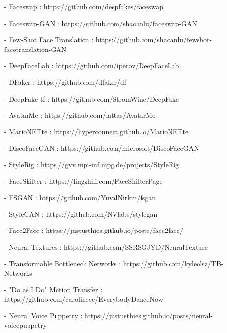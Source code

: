 \begin{itemize}

\item [-]Faceswap : https://github.com/deepfakes/faceswap

\item [-]Faceswap-GAN : https://github.com/shaoanlu/faceswap-GAN

\item [-]Few-Shot Face Translation : https://github.com/shaoanlu/fewshot-facetranslation-GAN

\item [-]DeepFaceLab : https://github.com/iperov/DeepFaceLab

\item [-]DFaker : https://github.com/dfaker/df

\item [-]DeepFake tf : https://github.com/StromWine/DeepFake

\item [-]AvatarMe : https://github.com/lattas/AvatarMe

\item [-]MarioNETte : https://hyperconnect.github.io/MarioNETte

\item [-]DiscoFaceGAN : https://github.com/microsoft/DiscoFaceGAN

\item [-]StyleRig : https://gvv.mpi-inf.mpg.de/projects/StyleRig

\item [-]FaceShifter : https://lingzhili.com/FaceShifterPage

\item [-]FSGAN : https://github.com/YuvalNirkin/fsgan

\item [-]StyleGAN : https://github.com/NVlabs/stylegan

\item [-]Face2Face : https://justusthies.github.io/posts/face2face/

\item [-]Neural Textures : https://github.com/SSRSGJYD/NeuralTexture

\item [-]Transformable Bottleneck Networks : https://github.com/kyleolsz/TB-Networks

\item [-]"Do as I Do" Motion Transfer : https://github.com/carolineec/EverybodyDanceNow

\item [-]Neural Voice Puppetry : https://justusthies.github.io/posts/neural-voicepuppetry

\end{itemize}

